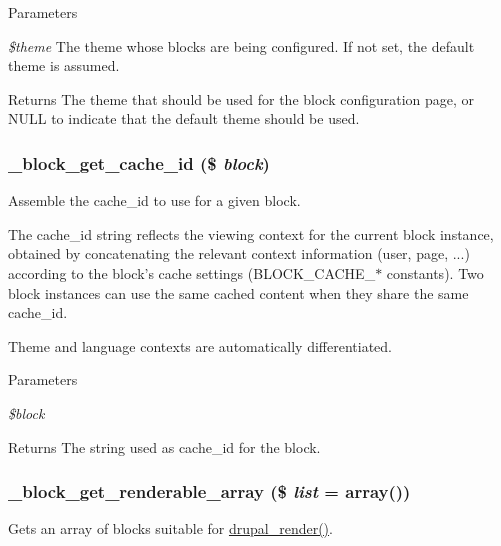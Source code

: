 \begin{DoxyParams}{Parameters}
\item[{\em \$theme}]The theme whose blocks are being configured. If not set, the default theme is assumed. \end{DoxyParams}
\begin{DoxyReturn}{Returns}
The theme that should be used for the block configuration page, or NULL to indicate that the default theme should be used. 
\end{DoxyReturn}
\hypertarget{block_8module_af008f1e1e134d730b902c97052e67f59}{
\subsubsection[{\_\-block\_\-get\_\-cache\_\-id}]{\setlength{\rightskip}{0pt plus 5cm}\_\-block\_\-get\_\-cache\_\-id (\$ {\em block})}}
\label{block_8module_af008f1e1e134d730b902c97052e67f59}
Assemble the cache\_\-id to use for a given block.

The cache\_\-id string reflects the viewing context for the current block instance, obtained by concatenating the relevant context information (user, page, ...) according to the block's cache settings (BLOCK\_\-CACHE\_\-$\ast$ constants). Two block instances can use the same cached content when they share the same cache\_\-id.

Theme and language contexts are automatically differentiated.


\begin{DoxyParams}{Parameters}
\item[{\em \$block}]\end{DoxyParams}
\begin{DoxyReturn}{Returns}
The string used as cache\_\-id for the block. 
\end{DoxyReturn}
\hypertarget{block_8module_adaff538964e0c5a2350dc3c133ae5c02}{
\subsubsection[{\_\-block\_\-get\_\-renderable\_\-array}]{\setlength{\rightskip}{0pt plus 5cm}\_\-block\_\-get\_\-renderable\_\-array (\$ {\em list} = {\ttfamily array()})}}
\label{block_8module_adaff538964e0c5a2350dc3c133ae5c02}
Gets an array of blocks suitable for \hyperlink{common_8inc_a05798b44e8d6c496d4bee5cc32fa7851}{drupal\_\-render()}.


